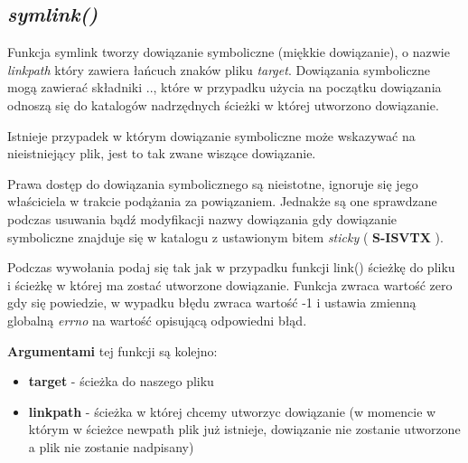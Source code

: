\documentclass{article}
\begin{document}
\subsection{\textit{symlink()}}

Funkcja symlink tworzy dowiązanie symboliczne (miękkie dowiązanie), o nazwie \textit{linkpath} który zawiera łańcuch znaków pliku \textit{target}. Dowiązania symboliczne mogą zawierać składniki .., które w przypadku użycia na początku dowiązania odnoszą się do katalogów nadrzędnych ścieżki w której utworzono dowiązanie.

Istnieje przypadek w którym dowiązanie symboliczne może wskazywać na nieistniejący plik, jest to tak zwane wiszące dowiązanie.

Prawa dostęp do dowiązania symbolicznego są nieistotne, ignoruje się jego właściciela w trakcie podążania za powiązaniem. Jednakże są one sprawdzane podczas usuwania bądź modyfikacji nazwy dowiązania gdy dowiązanie symboliczne znajduje się w katalogu z ustawionym bitem \textit{sticky} ( \textbf{S-ISVTX} ).

Podczas wywołania podaj się tak jak w przypadku funkcji link() ścieżkę do pliku i ścieżkę w której ma zostać utworzone dowiązanie.
Funkcja zwraca wartość zero gdy się powiedzie, w wypadku błędu zwraca wartość -1 i ustawia zmienną globalną \textit{errno} na wartość opisującą odpowiedni błąd.

\textbf{Argumentami} tej funkcji są kolejno:
\begin{itemize}
\item \textbf{target} - ścieżka do naszego pliku
\item \textbf{linkpath} - ścieżka w której chcemy utworzyc dowiązanie (w momencie w którym w ścieżce newpath plik już istnieje, dowiązanie nie zostanie utworzone a plik nie zostanie nadpisany)
\end{itemize}
\end{document}
